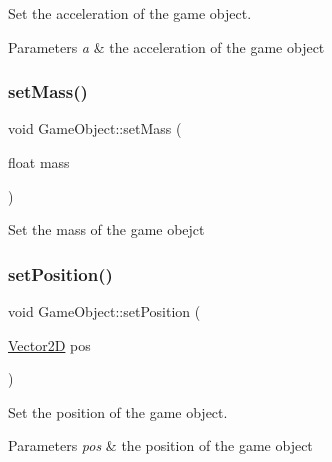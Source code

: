 Set the acceleration of the game object. 


\begin{DoxyParams}{Parameters}
{\em a} & the acceleration of the game object \\
\hline
\end{DoxyParams}
\mbox{\label{class_game_object_a71e7ea8def01d23f1696ba00a9669dc5}} 
\subsubsection{\texorpdfstring{set\+Mass()}{setMass()}}
{\footnotesize\ttfamily void Game\+Object\+::set\+Mass (\begin{DoxyParamCaption}\item[{float}]{mass }\end{DoxyParamCaption})\hspace{0.3cm}{\ttfamily [inline]}}

Set the mass of the game obejct \mbox{\label{class_game_object_af96bc25a3677e398982e55ed8032aa19}} 
\subsubsection{\texorpdfstring{set\+Position()}{setPosition()}}
{\footnotesize\ttfamily void Game\+Object\+::set\+Position (\begin{DoxyParamCaption}\item[{\mbox{\hyperlink{struct_vector2_d}{Vector2D}}}]{pos }\end{DoxyParamCaption})\hspace{0.3cm}{\ttfamily [inline]}}



Set the position of the game object. 


\begin{DoxyParams}{Parameters}
{\em pos} & the position of the game object \\
\hline
\end{DoxyParams}
\mbox{\label{class_game_object_a32361eefe52e77fd0ac60502dab7aa86}} 
